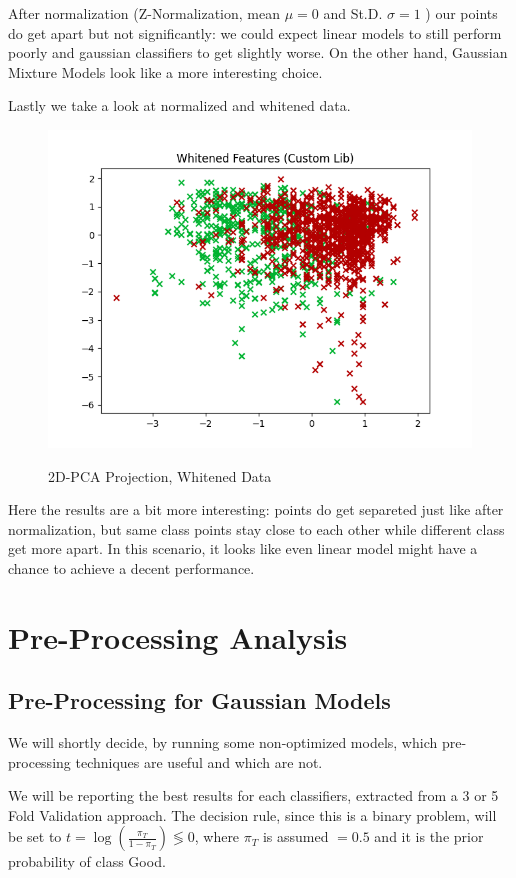 \documentclass[12pt, twocolumn]{article}
\begin{document}
After normalization (Z-Normalization, mean $\mu = 0$ and St.D. $\sigma = 1$ ) our points do get apart but not significantly: we could expect linear models to still perform poorly and gaussian classifiers to get slightly worse. On the other hand, Gaussian Mixture Models look like a more interesting choice.

Lastly we take a look at normalized and whitened data.

\begin{figure}[H]
    \caption{2D-PCA Projection, Whitened Data}
    {\includegraphics[width=\linewidth]{2DWhitened.png}}
    \label{2DWHI}
\end{figure}

Here the results are a bit more interesting: points do get separeted just like after normalization, but same class points stay close to each other while different class get more apart. In this scenario, it looks like even linear model might have a chance to achieve a decent performance.

\newpage
\section{Pre-Processing Analysis}
\subsection{Pre-Processing for Gaussian Models}

We will shortly decide, by running some non-optimized models, which pre-processing techniques are useful and which are not. 

We will be reporting the best results for each classifiers, extracted from a 3 or 5 Fold Validation approach. The decision rule, since this is a binary problem, will be set to $\displaystyle t = \log(\frac{\pi_T}{1-\pi_T}) \lessgtr 0 $, where $\pi_T$ is assumed $ = 0.5$ and it is the prior probability of class Good.
\end{document}
